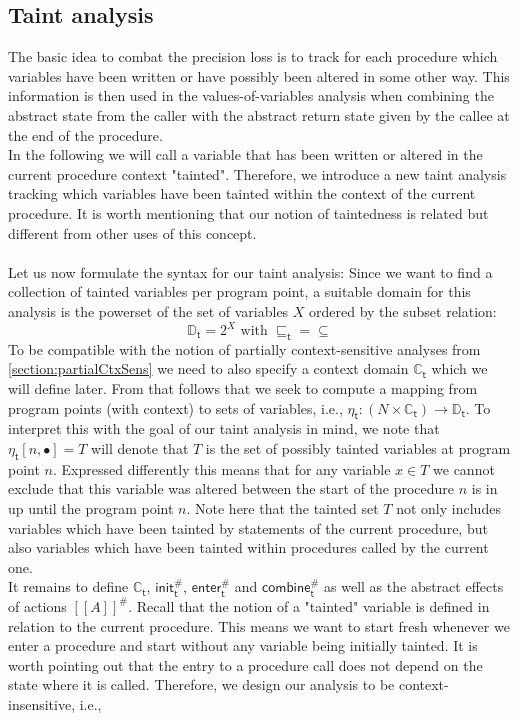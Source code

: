     \subsection{Taint analysis}\label{section:formalTaint}
      The basic idea to combat the precision loss is to track for each procedure which variables have been written or have possibly been altered in some other way. This information is then used in the values-of-variables analysis when combining the abstract state from the caller with the abstract return state given by the callee at the end of the procedure.\\
      In the following we will call a variable that has been written or altered in the current procedure context "tainted". Therefore, we introduce a new taint analysis tracking which variables have been tainted within the context of the current procedure. It is worth mentioning that our notion of taintedness is related but different from other uses of this concept.\\
      \\
      Let us now formulate the syntax for our taint analysis: Since we want to find a collection of tainted variables per program point, a suitable domain for this analysis is the powerset of the set of variables $X$ ordered by the subset relation:
      \[\mathbb{D}_\textsf{t} = 2^X \text{ with } \sqsubseteq_\textsf{t} = \subseteq\]
      To be compatible with the notion of partially context-sensitive analyses from \autoref{section:partialCtxSens} we need to also specify a context domain $\mathbb{C}_\textsf{t}$ which we will define later.
      From that follows that we seek to compute a mapping from program points (with context) to sets of variables, i.e., $\eta_\textsf{t}: (N \times \mathbb{C}_\textsf{t}) \rightarrow \mathbb{D}_\textsf{t}$. To interpret this with the goal of our taint analysis in mind, we note that $\eta_\textsf{t} [n, \bullet] = T$ will denote that $T$ is the set of possibly tainted variables at program point $n$. Expressed differently this means that for any variable $x \in T$ we cannot exclude that this variable was altered between the start of the procedure $n$ is in up until the program point $n$. Note here that the tainted set $T$ not only includes variables which have been tainted by statements of the current procedure, but also variables which have been tainted within procedures called by the current one.\\
      It remains to define $\mathbb{C}_\textsf{t}$, $\textsf{init}^{\#}_\textsf{t}$, $\textsf{enter}^{\#}_\textsf{t}$ and $\textsf{combine}^{\#}_\textsf{t}$ as well as the abstract effects of actions $[\![ A ]\!]^{\#}$. Recall that the notion of a "tainted" variable is defined in relation to the current procedure. This means we want to start fresh whenever we enter a procedure and start without any variable being initially tainted. It is worth pointing out that the entry to a procedure call does not depend on the state where it is called. Therefore, we design our analysis to be context-insensitive, i.e., 
